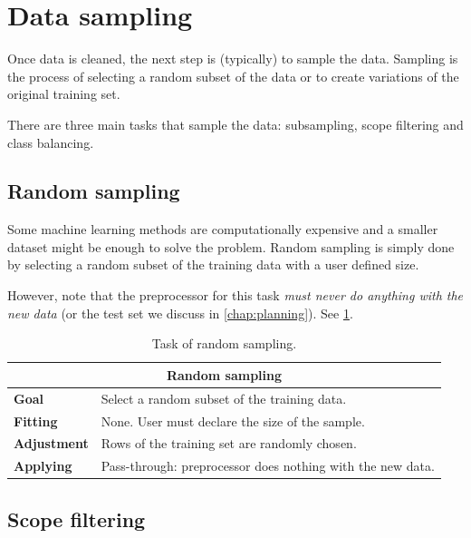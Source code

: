 \section{Data sampling}

Once data is cleaned, the next step is (typically) to sample the data.  Sampling is the
process of selecting a random subset of the data or to create variations of the original
training set.

There are three main tasks that sample the data: subsampling, scope filtering and class
balancing.

\subsection{Random sampling}
\label{sub:random-sampling}

Some machine learning methods are computationally expensive and a smaller dataset might be
enough to solve the problem.  Random sampling is simply done by selecting a random subset
of the training data with a user defined size.

However, note that the preprocessor for this task \emph{must never do anything with the
new data} (or the test set we discuss in \cref{chap:planning}).  See
\cref{tab:random-sampling}.

\begin{table}\caption{Task of random sampling.}
  \centering
  \begin{tabular}{lp{6cm}}
    \toprule
    \multicolumn{2}{c}{\textbf{Random sampling}} \\
    \midrule
    \textbf{Goal} &
      Select a random subset of the training data. \\
    \textbf{Fitting} &
      None. User must declare the size of the sample. \\
    \textbf{Adjustment} &
      Rows of the training set are randomly chosen. \\
    \textbf{Applying} &
      Pass-through: preprocessor does nothing with the new data. \\
    \bottomrule
  \end{tabular}
  \label{tab:random-sampling}
\end{table}

\subsection{Scope filtering}

